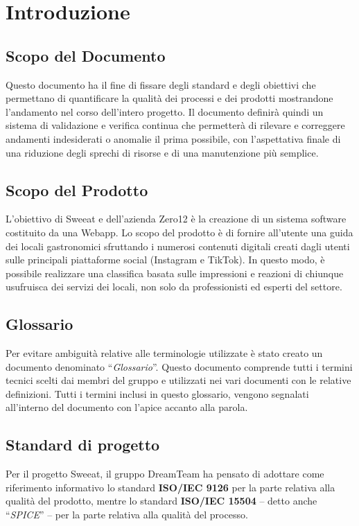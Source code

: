 \section{Introduzione}

\subsection{Scopo del Documento}
Questo documento ha il fine di fissare degli standard e degli obiettivi che permettano di quantificare la qualità dei processi e dei prodotti mostrandone l’andamento nel corso dell’intero progetto.
Il documento definirà quindi un sistema di validazione e verifica continua che permetterà di rilevare e correggere andamenti indesiderati o anomalie il prima possibile, con l'aspettativa finale di una riduzione degli sprechi di risorse e di una manutenzione più semplice.

\subsection{Scopo del Prodotto}

L’obiettivo di Sweeat e dell’azienda Zero12 è la creazione di un sistema software costituito da una Webapp. Lo scopo del prodotto è di fornire all’utente una guida dei locali gastronomici sfruttando i numerosi contenuti digitali creati dagli utenti sulle principali piattaforme social (Instagram e TikTok). In questo modo, è possibile realizzare una classifica basata sulle impressioni e reazioni di chiunque usufruisca dei servizi dei locali, non solo da professionisti ed esperti del settore.

\subsection{Glossario}

Per evitare ambiguità relative alle terminologie utilizzate è stato creato un documento denominato “\textit{Glossario}”. Questo documento comprende tutti i termini tecnici scelti dai membri del gruppo e utilizzati nei vari documenti con le relative definizioni. Tutti i termini inclusi in questo glossario, vengono segnalati all’interno del documento con l’apice \glo{} accanto alla parola.

\subsection{Standard di progetto}
Per il progetto Sweeat, il gruppo DreamTeam ha pensato di adottare come riferimento informativo lo standard \textbf{ISO/IEC 9126} per la parte relativa alla qualità del prodotto, mentre lo standard \textbf{ISO/IEC 15504} – detto anche “\textit{SPICE}” – per la parte relativa alla qualità del processo.

